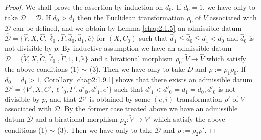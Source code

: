 \begin{proof}
We shall prove the assertion by induction on $d_{0}$. If $d_{0}=1$, we
have only to take $\widetilde{\mathscr{D}}=\mathscr{D}$. If
$d_{0}>d_{1}$ then the Euclidean transformation $\rho_{0}$ of $V$
associated with $\mathscr{D}$ can be defined, and we obtain by Lemma
\ref{chap2:1.5} an admissible datum
$\widehat{\mathscr{D}}=\{\widehat{V},X,\widehat{C},\widehat{\ell}_{0},\widehat{\Gamma},\widehat{d}_{0},\widehat{d}_{1},\widehat{e}\}$
for $(X,C_{0})$ such that $\widehat{d}_{1}\leqq \widehat{d}_{0}\leqq
d_{1}<d_{0}$ and $\widehat{d}_{0}$ is not divisible by $p$. By
inductive assumption we have an admissible datum\pageoriginale\
$\widetilde{\mathscr{D}}=\{\widetilde{V},X,\widetilde{C},\widetilde{\ell}_{0},\widetilde{\Gamma},1,1,\widetilde{e}\}$
and a birational morphism $\rho_{0}:\widetilde{V}\to \widehat{V}$
which satisfy the above conditions (1) $\sim$ (3). Then we have only
to take $\widetilde{D}$ and $\rho:=\rho_{1}\rho_{0}$. If
$d_{0}=d_{1}>1$, Corollary \ref{chap2:1.9.1} shows that there exists an
admissible datum
$\mathscr{D}'=\{V',X,C',\ell'_{0},\Gamma',d'_{0},d'_{1},e'\}$ such
that $d'_{1}<d'_{0}=d_{1}=d_{0},d'_{0}$ is not divisible by $p$, and
that $\mathscr{D}'$ is obtained by some $(e,i)$-transformation $\rho'$
of $V$ associated with $\mathscr{D}$. By the former case treated above
we have an admissible datum $\widetilde{\mathscr{D}}$ and a birational
morphism $\rho_{2}:\widetilde{V}\to V'$ which satisfy the above
conditions (1) $\sim$ (3). Then we have only to take
$\widetilde{\mathscr{D}}$ and $\rho:=\rho_{2}\rho'$.
\end{proof}

